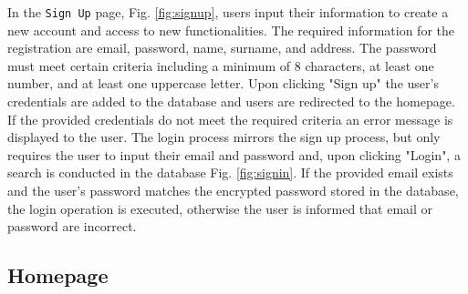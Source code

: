 In the \texttt{Sign Up} page, Fig. \ref{fig:signup}, users input their information to create a new account and access to new functionalities. The required information for the registration are email, password, name, surname, and address. The password must meet certain criteria including a minimum of 8 characters, at least one number, and at least one uppercase letter. Upon clicking "Sign up" the user's credentials are added to the database and users are redirected to the homepage. If the provided credentials do not meet the required criteria an error message is displayed to the user. The login process mirrors the sign up process, but only requires the user to input their email and password and, upon clicking "Login", a search is conducted in the database Fig. \ref{fig:signin}. If the provided email exists and the user's password matches the encrypted password stored in the database, the login operation is executed, otherwise the user is informed that email or password are incorrect.

\subsection{Homepage}


